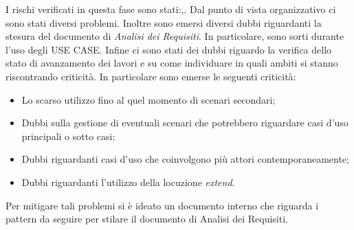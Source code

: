 I rischi verificati in questa fase sono stati:,.
Dal punto di vista organizzativo ci sono stati diversi problemi. Inoltre sono emersi diversi dubbi riguardanti la stesura del documento di \emph{Analisi dei Requisiti}.
In particolare, sono sorti durante l'uso degli USE CASE. Infine ci sono stati dei dubbi riguardo la verifica dello stato di avanzamento dei lavori e su come individuare in quali ambiti si stanno riscontrando criticità.
In particolare sono emerse le seguenti criticità:
\begin{itemize}
    \item Lo scarso utilizzo fino al quel momento di scenari secondari;
    \item Dubbi sulla gestione di eventuali scenari che potrebbero riguardare casi d’uso principali o sotto casi;
    \item Dubbi riguardanti casi d’uso che coinvolgono più attori contemporaneamente;
    \item Dubbi riguardanti l'utilizzo della locuzione \emph{extend}.
\end{itemize}
Per mitigare tali problemi si è ideato un documento interno che riguarda i pattern da seguire per stilare il documento di Analisi dei Requisiti.
